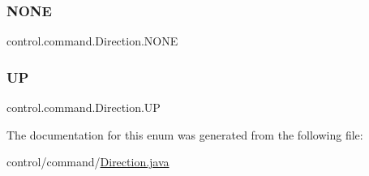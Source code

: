 \subsubsection{\texorpdfstring{NONE}{NONE}}
{\footnotesize\ttfamily control.\+command.\+Direction.\+N\+O\+NE}

\mbox{\label{enumcontrol_1_1command_1_1_direction_adb50bdf4a75fea7f0cb851c1e5a42dd9}} 
\subsubsection{\texorpdfstring{UP}{UP}}
{\footnotesize\ttfamily control.\+command.\+Direction.\+UP}



The documentation for this enum was generated from the following file\+:\begin{DoxyCompactItemize}
\item 
control/command/\mbox{\hyperlink{_direction_8java}{Direction.\+java}}\end{DoxyCompactItemize}
